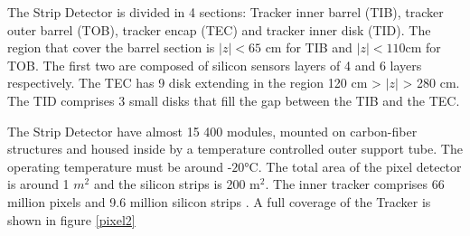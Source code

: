 The Strip Detector is divided in 4 sections: Tracker inner barrel (TIB), tracker outer barrel (TOB), tracker encap (TEC) and tracker inner disk (TID). The region that cover the barrel section is $|z|<65$ cm for TIB and $|z|<110$cm for TOB. The first two are composed of silicon sensors layers of 4 and 6 layers respectively. The TEC has 9 disk extending in the region 120 cm > $|z|$ > 280 cm. The 
TID comprises 3 small disks that fill the gap between the TIB and the TEC.


The Strip Detector have almost 15 400 modules, mounted on
carbon-fiber structures and housed inside by a temperature controlled outer support tube. The operating temperature must be around -$\ang{20}$C. 
The total area of the pixel detector is around 1 $m^2$ and the silicon strips is 200 m$^2$. 
The inner tracker comprises 66 million pixels and 9.6
million silicon strips \cite{cms-manual}.
A full coverage of the Tracker is shown in figure \ref{pixel2}
\\

